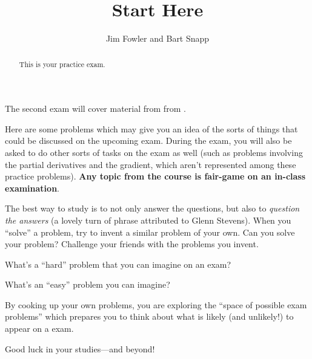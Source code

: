\documentclass{ximera}
\author{Jim Fowler and Bart Snapp}
\title{Start Here}
\begin{document}
\begin{abstract}
  This is your practice exam.
\end{abstract}

\maketitle

The second exam will cover material from from
.


Here are some problems which may give you an idea of the sorts of
things that could be discussed on the upcoming exam.  During the exam,
you will also be asked to do other sorts of tasks on the exam as well
(such as problems involving the partial derivatives and the gradient,
which aren't represented among these practice problems).  \textbf{Any
  topic from the course is fair-game on an in-class examination}.


The best way to study is to not only answer the questions, but also to
\textit{question the answers} (a lovely turn of phrase attributed to
Glenn Stevens).  When you ``solve'' a problem, try to invent a similar
problem of your own.  Can you solve your problem?  Challenge your
friends with the problems you invent.

What's a ``hard'' problem that you can imagine on an exam?
\begin{freeResponse}
\end{freeResponse}

What's an ``easy'' problem you can imagine?
\begin{freeResponse}
\end{freeResponse}

By cooking up your own problems, you are exploring the ``space of
possible exam problems'' which prepares you to think about what is
likely (and unlikely!) to appear on a exam.

Good luck in your studies---and beyond!
\end{document}
